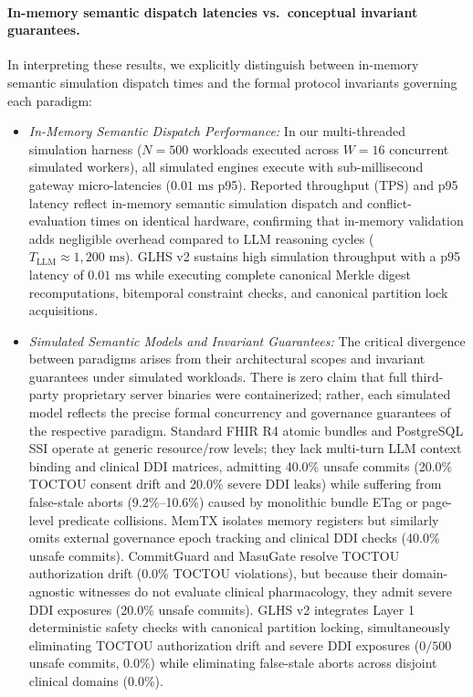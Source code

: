 \documentclass[11pt]{article}
\begin{document}
\paragraph{In-memory semantic dispatch latencies vs.\ conceptual invariant guarantees.}
In interpreting these results, we explicitly distinguish between in-memory semantic simulation dispatch times and the formal protocol invariants governing each paradigm:
\begin{itemize}
  \item \emph{In-Memory Semantic Dispatch Performance:} In our multi-threaded simulation harness ($N=500$ workloads executed across $W=16$ concurrent simulated workers), all simulated engines execute with sub-millisecond gateway micro-latencies ($0.01\text{ ms}$ p95). Reported throughput (TPS) and p95 latency reflect in-memory semantic simulation dispatch and conflict-evaluation times on identical hardware, confirming that in-memory validation adds negligible overhead compared to LLM reasoning cycles ($T_{\text{LLM}} \approx 1{,}200\text{ ms}$). GLHS v2 sustains high simulation throughput with a p95 latency of $0.01\text{ ms}$ while executing complete canonical Merkle digest recomputations, bitemporal constraint checks, and canonical partition lock acquisitions.
  \item \emph{Simulated Semantic Models and Invariant Guarantees:} The critical divergence between paradigms arises from their architectural scopes and invariant guarantees under simulated workloads. There is zero claim that full third-party proprietary server binaries were containerized; rather, each simulated model reflects the precise formal concurrency and governance guarantees of the respective paradigm. Standard FHIR R4 atomic bundles and PostgreSQL SSI operate at generic resource/row levels; they lack multi-turn LLM context binding and clinical DDI matrices, admitting 40.0\% unsafe commits (20.0\% TOCTOU consent drift and 20.0\% severe DDI leaks) while suffering from false-stale aborts (9.2\%--10.6\%) caused by monolithic bundle ETag or page-level predicate collisions. MemTX isolates memory registers but similarly omits external governance epoch tracking and clinical DDI checks (40.0\% unsafe commits). CommitGuard and MasuGate resolve TOCTOU authorization drift (0.0\% TOCTOU violations), but because their domain-agnostic witnesses do not evaluate clinical pharmacology, they admit severe DDI exposures (20.0\% unsafe commits). GLHS v2 integrates Layer 1 deterministic safety checks with canonical partition locking, simultaneously eliminating TOCTOU authorization drift and severe DDI exposures ($0/500$ unsafe commits, 0.0\%) while eliminating false-stale aborts across disjoint clinical domains (0.0\%).
\end{itemize}
\end{document}
